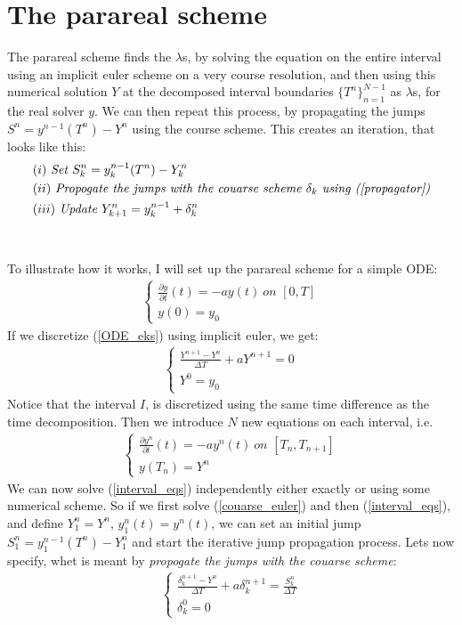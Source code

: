 \documentclass[11pt,a4paper]{article}
\begin{document}
\section{The parareal scheme} 
The parareal scheme finds the $\lambda$s, by solving the equation on the entire interval using an implicit euler scheme on a very course resolution, and then using this numerical solution $Y$ at the decomposed interval boundaries $\{T^n\}_{n=1}^{N-1}$ as $\lambda$s, for the real solver $y$. We can then repeat this process, by propagating the jumps $S^n=y^{n-1}(T^n)-Y^n$ using the course scheme. This creates an iteration, that looks like this:
\begin{align*}
&(i) \ \textit{Set $S^n_k = y_k^{n-1}(T^n)-Y_k^n$} \\
&(ii) \ \textit{Propogate the jumps with the couarse scheme $\delta_k$ using (\ref{propagator})} \\
&(iii) \ \textit{Update $Y_{k+1}^n=y_k^{n-1} + \delta_k^n$}
\end{align*} 
\\
\\
To illustrate how it works, I will set up the parareal scheme for a simple ODE:
\begin{align}
\left\{
     \begin{array}{lr}
		\frac{\partial y}{\partial t}(t)=-ay(t) \ 				\textit{on $[0,T]$} \\
		y(0)=y_0
	\end{array}
\right.	\label{ODE_eks}
\end{align}
If we discretize (\ref{ODE_eks}) using implicit euler, we get:
\begin{align}
\left\{
     \begin{array}{lr}
		\frac{Y^{n+1}-Y^{n}}{\Delta T}+aY^{n+1}=0  \\
		Y^0=y_0
	\end{array}
\right.	\label{couarse_euler}
\end{align}
Notice that the interval $I$, is discretized using the same time difference as the time decomposition. Then we introduce $N$ new equations on each interval, i.e.
\begin{align}
\left\{
     \begin{array}{lr}
		\frac{\partial y^n}{\partial t}(t)=-ay^n(t) \ 				\textit{on $[T_n,T_{n+1}]$} \\
		y(T_n)=Y^n
	\end{array}
\right. \label{interval_eqs}
\end{align}
We can now solve (\ref{interval_eqs}) independently either exactly or using some numerical scheme. So if we first solve (\ref{couarse_euler}) and then (\ref{interval_eqs}), and define $Y_1^n=Y^n$, $y_1^n(t)=y^n(t)$, we can set an initial jump $S_1^n=y_1^{n-1}(T^n)-Y_1^n$ and start the iterative jump propagation process. Lets now specify, whet is meant by \textit{propogate the jumps with the couarse scheme}:
\begin{align}
\left\{
     \begin{array}{lr}
		\frac{\delta_k^{n+1}-Y^{n}}{\Delta T}+a\delta_k^{n+1}=\frac{S_k ^n}{\Delta T}  \\
		\delta_k^0=0
	\end{array}
\right. \label{propagator}
\end{align}  


\end{document}
